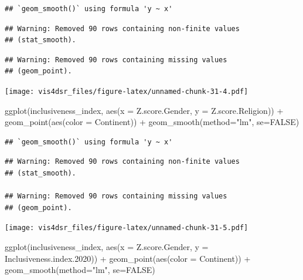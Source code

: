 \documentclass[
]{krantz}
\makeatletter
\newenvironment{Shaded}{\begin{snugshade}}{\end{snugshade}}
\newcommand{\AttributeTok}[1]{\textcolor[rgb]{0.61,0.61,0.61}{#1}}
\newcommand{\ConstantTok}[1]{\textcolor[rgb]{0,0,0}{#1}}
\newcommand{\FloatTok}[1]{\textcolor[rgb]{0.06,0.06,0.06}{#1}}
\newcommand{\FunctionTok}[1]{\textcolor[rgb]{0,0,0}{#1}}
\newcommand{\NormalTok}[1]{#1}
\newcommand{\SpecialCharTok}[1]{\textcolor[rgb]{0,0,0}{#1}}
\newcommand{\StringTok}[1]{\textcolor[rgb]{0.5,0.5,0.5}{#1}}
\newenvironment{kframe}{%
\medskip{}
\setlength{\fboxsep}{.8em}
 \def\at@end@of@kframe{}%
 \ifinner\ifhmode%
  \def\at@end@of@kframe{\end{minipage}}%
  \begin{minipage}{\columnwidth}%
 \fi\fi%
 \def\FrameCommand##1{\hskip\@totalleftmargin \hskip-\fboxsep
 \colorbox{shadecolor}{##1}\hskip-\fboxsep
     \hskip-\linewidth \hskip-\@totalleftmargin \hskip\columnwidth}%
 \MakeFramed {\advance\hsize-\width
   \@totalleftmargin\z@ \linewidth\hsize
   \@setminipage}}%
 {\par\unskip\endMakeFramed%
 \at@end@of@kframe}
\renewenvironment{Shaded}{\begin{kframe}}{\end{kframe}}
\makeatother
\begin{document}
\begin{verbatim}
## `geom_smooth()` using formula 'y ~ x'
\end{verbatim}

\begin{verbatim}
## Warning: Removed 90 rows containing non-finite values
## (stat_smooth).
\end{verbatim}

\begin{verbatim}
## Warning: Removed 90 rows containing missing values
## (geom_point).
\end{verbatim}

\texttt{[image: vis4dsr\_files/figure-latex/unnamed-chunk-31-4.pdf]}

\begin{Shaded}
\begin{Highlighting}[]
\FunctionTok{ggplot}\NormalTok{(inclusiveness\_index, }
       \FunctionTok{aes}\NormalTok{(}\AttributeTok{x =}\NormalTok{ Z.score.Gender, }
           \AttributeTok{y =}\NormalTok{ Z.score.Religion)) }\SpecialCharTok{+}
  \FunctionTok{geom\_point}\NormalTok{(}\FunctionTok{aes}\NormalTok{(}\AttributeTok{color =}\NormalTok{ Continent)) }\SpecialCharTok{+}
  \FunctionTok{geom\_smooth}\NormalTok{(}\AttributeTok{method=}\StringTok{"lm"}\NormalTok{, }\AttributeTok{se=}\ConstantTok{FALSE}\NormalTok{)}
\end{Highlighting}
\end{Shaded}

\begin{verbatim}
## `geom_smooth()` using formula 'y ~ x'
\end{verbatim}

\begin{verbatim}
## Warning: Removed 90 rows containing non-finite values
## (stat_smooth).

## Warning: Removed 90 rows containing missing values
## (geom_point).
\end{verbatim}

\texttt{[image: vis4dsr\_files/figure-latex/unnamed-chunk-31-5.pdf]}

\begin{Shaded}
\begin{Highlighting}[]
\FunctionTok{ggplot}\NormalTok{(inclusiveness\_index, }
       \FunctionTok{aes}\NormalTok{(}\AttributeTok{x =}\NormalTok{ Z.score.Gender, }
           \AttributeTok{y =}\NormalTok{ Inclusiveness.index}\FloatTok{.2020}\NormalTok{)) }\SpecialCharTok{+}
  \FunctionTok{geom\_point}\NormalTok{(}\FunctionTok{aes}\NormalTok{(}\AttributeTok{color =}\NormalTok{ Continent)) }\SpecialCharTok{+}
  \FunctionTok{geom\_smooth}\NormalTok{(}\AttributeTok{method=}\StringTok{"lm"}\NormalTok{, }\AttributeTok{se=}\ConstantTok{FALSE}\NormalTok{)}
\end{Highlighting}
\end{Shaded}
\end{document}
